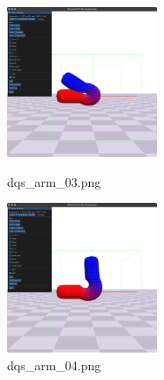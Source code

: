 \documentclass[a4paper,10pt,uplatex,dvipdfmx]{jsarticle}
\begin{document}
\begin{itemize}
  \begin{figure}[H]
    \begin{minipage}{0.33\hsize}
      \begin{center}
        \includegraphics[width=45mm]{img/dqs_arm_03.png}
        \caption{dqs\_arm\_03.png}
      \end{center}
    \end{minipage}
    \begin{minipage}{0.33\hsize}
      \begin{center}
        \includegraphics[width=45mm]{img/dqs_arm_04.png}
        \caption{dqs\_arm\_04.png}
      \end{center}
    \end{minipage}
  \end{figure}


\end{itemize}
\end{document}

